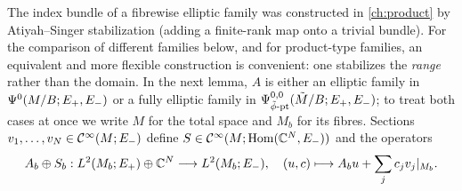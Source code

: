 The index bundle of a fibrewise elliptic family was constructed in
\cref{ch:product} by Atiyah--Singer stabilization (adding a finite-rank map
onto a trivial bundle). For the comparison of
different families below, and for product-type families, an equivalent and
more flexible construction is convenient: one stabilizes the \emph{range}
rather than the domain. In the next lemma, $A$ is either an elliptic family in
$\Psi^{0}(M/B;E_+,E_-)$ or a fully elliptic family in
$\Psi^{0,0}_{\tilde\phi\text{-}\mathrm{pt}}(\tilde M/B;E_+,E_-)$; to treat both cases at once we write $M$
for the total space and $M_b$ for its fibres. Sections $v_1,\dots,v_N\in
\mathcal{C}^\infty(M;E_-)$ define $S\in\mathcal{C}^\infty(M;\operatorname{Hom}(\mathbb{C}^N,E_-))$ and the operators
\begin{equation*}
  A_b\oplus S_b:L^2(M_b;E_+)\oplus\mathbb{C}^N\longrightarrow L^2(M_b;E_-),\quad
  (u,c)\longmapsto A_bu+\sum_jc_jv_j|_{M_b}.
\end{equation*}

